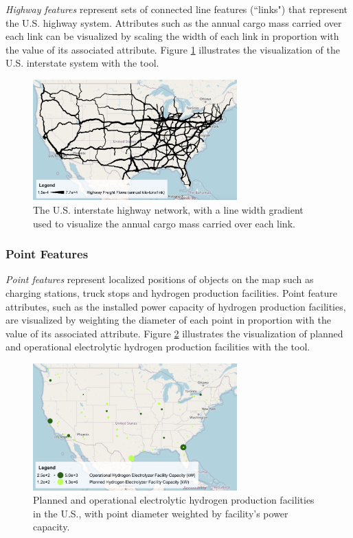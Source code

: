 \textit{Highway features} represent sets of connected line features (``links") that represent the U.S. highway system. Attributes such as the annual cargo mass carried over each link can be visualized by scaling the width of each link in proportion with the value of its associated attribute. Figure \ref{fig:highway_flows} illustrates the visualization of the U.S. interstate system with the tool. 

\begin{figure}[ht]
        \centering
        \includegraphics[width=0.7\textwidth]{figures/highway_flows.png}
        \caption{The U.S. interstate highway network, with a line width gradient used to visualize the annual cargo mass carried over each link.}
        \label{fig:highway_flows}
\end{figure}

\subsubsection{Point Features}

\textit{Point features} represent localized positions of objects on the map such as charging stations, truck stops and hydrogen production facilities. Point feature attributes, such as the installed power capacity of hydrogen production facilities, are visualized by weighting the diameter of each point in proportion with the value of its associated attribute. Figure \ref{fig:electrolyzer_facilities} illustrates the visualization of planned and operational electrolytic hydrogen production facilities with the tool. 

\begin{figure}[ht]
        \centering
        \includegraphics[width=0.7\textwidth]{figures/electrolyzer_facilities.png}
        \caption{Planned and operational electrolytic hydrogen production facilities in the U.S., with point diameter weighted by facility's power capacity.}
        \label{fig:electrolyzer_facilities}
\end{figure}

